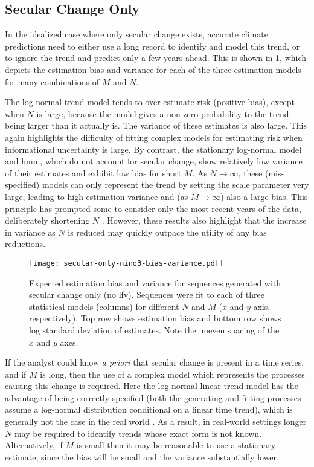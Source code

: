 \documentclass[
  draft,
  linenumbers
]{agujournal2019}
\begin{document}
\subsection{Secular Change Only}

In the idealized case where only secular change exists, accurate climate predictions need to either use a long record to identify and model this trend, or to ignore the trend and predict only a few years ahead.
This is shown in \cref{fig:secular-nino3-bias-variance}, which depicts the estimation bias and variance for each of the three estimation models for many combinations of $M$ and $N$.

The log-normal trend model tends to over-estimate risk (positive bias), except when $N$ is large, because the model gives a non-zero probability to the trend being larger than it actually is.
The variance of these estimates is also large.
This again highlights the difficulty of fitting complex models for estimating risk when informational uncertainty is large.
By contrast, the stationary log-normal model and \gls{hmm}, which do not account for secular change, show relatively low variance of their estimates and exhibit low bias for short $M$.
As $N \rightarrow \infty$, these (mis-specified) models can only represent the trend by setting the scale parameter very large, leading to high estimation variance and (as $M \rightarrow \infty$) also a large bias.
This principle has prompted some to consider only the most recent years of the data, deliberately shortening $N$ \citep[i.e.\@\xspace,][]{Muller:2014fc}.
However, these results also highlight that the increase in variance as $N$ is reduced may quickly outpace the utility of any bias reductions.

\begin{figure}
  \centering
  \texttt{[image: secular-only-nino3-bias-variance.pdf]}
  \caption{
    Expected estimation bias and variance for sequences generated with secular change only (no \gls{lfv}).
    Sequences were fit to each of three statistical models (columns) for different $N$ and $M$ ($x$ and $y$ axis, respectively).
    Top row shows estimation bias and bottom row shows log standard deviation of estimates.
    Note the uneven spacing of the $x$ and $y$ axes.
  }\label{fig:secular-nino3-bias-variance}
\end{figure}

If the analyst could know \emph{a priori} that secular change is present in a time series, and if $M$ is long, then the use of a complex model which represents the processes causing this change is required.
Here the log-normal linear trend model has the advantage of being correctly specified (both the generating and fitting processes assume a log-normal distribution conditional on a linear time trend), which is generally not the case in the real world \citep{Montanari:2014hl,Serinaldi:2015bq}.
As a result, in real-world settings longer $N$ may be required to identify trends whose exact form is not known.
Alternatively, if $M$ is small then it may be reasonable to use a stationary estimate, since the bias will be small and the variance substantially lower.
\end{document}
